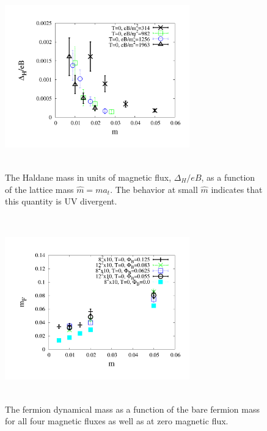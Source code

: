 \documentclass[aps,prd,twocolumn,showpacs,superscriptaddress,groupedaddress]{revtex4}  %
\begin{document}
\begin{figure}
 \includegraphics[height=8cm,width=8cm]{haldanediveB_vs_m_zeroT_graphene_paper.pdf} \hspace{-1cm}
\caption{The Haldane mass in units of magnetic flux, $\Delta_H/eB$, as a function of the lattice mass $\hat{m} = m a_t$. The behavior at small $\hat{m}$ indicates that
this quantity is UV divergent.}
\label{HaldanediveBvsm} 
\end{figure}

\begin{figure}
  \includegraphics[height=8cm,width=8cm]{ferm_mt_vs_m_graphene_paper.pdf} \hspace{-1cm}
\caption{The fermion dynamical mass as a function of the bare fermion mass for all four magnetic fluxes as well as at zero magnetic flux.}
\label{MFvsm}
\end{figure}
\end{document}
